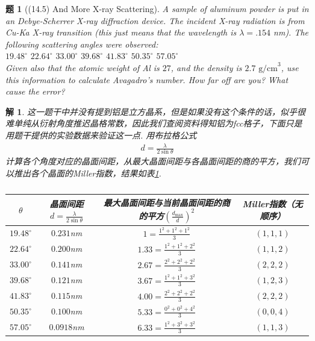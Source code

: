 \documentclass[UTF8,10pt,a4paper]{article}
\theoremstyle{Problem}
\newtheorem{prob}{题}
\theoremstyle{Solution}
\newtheorem*{sol}{解}
\begin{document}
\begin{prob}[(14.5) And More X-ray Scattering]
    A sample of aluminum powder is put in an Debye-Scherrer X-ray diffraction device. The incident X-ray radiation is from Cu-Ka X-ray transition (this just means that the wavelength is $\lambda=.154$ nm). The following scattering angles were observed:\\
    $19.48^{\circ}$ $22.64^{\circ}$ $33.00^{\circ}$ $39.68^{\circ}$ $41.83^{\circ}$ $50.35^{\circ}$ $57.05^{\circ}$\\
    Given also that the atomic weight of Al is $27$, and the density is $2.7\text{ g/cm}^3$, use this information to calculate Avagadro's number. How far off are you? What cause the error?
\end{prob}
\begin{sol}
    这一题干中并没有提到铝是立方晶系，但是如果没有这个条件的话，似乎很难单纯从衍射角度推迟晶格常数，因此我们查阅资料得知铝为fcc格子，下面只是用题干提供的实验数据来验证这一点. 用布拉格公式
    \begin{align}
        d=\frac{\lambda}{2\sin\theta}
    \end{align}
    计算各个角度对应的晶面间距，从最大晶面间距与各晶面间距的商的平方，我们可以推出各个晶面的Miller指数，结果如表\ref{4-T}.
    \begin{table}[h]
        \centering
        \caption{}
        \label{4-T}
        \begin{tabular}{cccc}
        \hline
        $\theta$ & 晶面间距$d=\frac{\lambda}{2\sin\theta}$ & 最大晶面间距与当前晶面间距的商的平方$\left(\frac{d_{\max}}{d}\right)^2$ & Miller指数（无顺序） \\ \hline
        $19.48^{\circ}$ & $0.231$nm & $1=\frac{1^2+1^2+1^2}{3}$ & $(1,1,1)$ \\
        $22.64^{\circ}$ & $0.200$nm & $1.33=\frac{1^2+1^2+2^2}{3}$ & $(1,1,2)$ \\
        $33.00^{\circ}$ & $0.141$nm & $2.67=\frac{2^2+2^2+2^2}{3}$ & $(2,2,2)$ \\
        $39.68^{\circ}$ & $0.121$nm & $3.67=\frac{1^2+1^2+3^2}{3}$ & $(1,2,3)$ \\
        $41.83^{\circ}$ & $0.115$nm & $4.00=\frac{2^2+2^2+2^2}{3}$ & $(2,2,2)$ \\
        $50.35^{\circ}$ & $0.100$nm & $5.33=\frac{0^2+0^2+4^2}{3}$ & $(0,0,4)$ \\
        $57.05^{\circ}$ & $0.0918$nm & $6.33=\frac{1^2+3^2+3^2}{3}$ & $(1,1,3)$ \\ \hline
        \end{tabular}

\end{table}
\end{sol}
\end{document}
